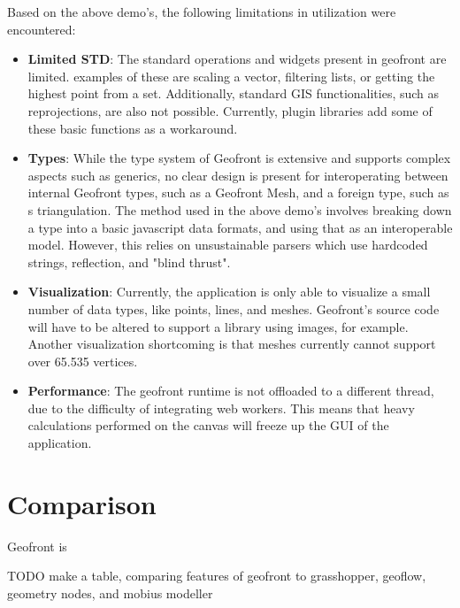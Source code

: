 Based on the above demo's, the following limitations in utilization were encountered: 
\begin{itemize}
  \item \textbf{Limited STD}: The standard operations and widgets present in geofront are limited. 
  examples of these are scaling a vector, filtering lists, or getting the highest point from a set.
  Additionally, standard \ac{GIS} functionalities, such as reprojections, are also not possible. 
  Currently, plugin libraries add some of these basic functions as a workaround.    

  \item \textbf{Types}: While the type system of Geofront is extensive and supports complex aspects such as generics, no clear design is present for interoperating between internal Geofront types, such as a Geofront Mesh, and a foreign type, such as s triangulation. 
  The method used in the above demo's involves breaking down a type into a basic javascript data formats, and using that as an interoperable model. 
  However, this relies on unsustainable parsers which use hardcoded strings, reflection, and "blind thrust".

  \item \textbf{Visualization}: Currently, the application is only able to visualize a small number of data types, like points, lines, and meshes. Geofront's source code will have to be altered to support a library using images, for example.
  Another visualization shortcoming is that meshes currently cannot support over 65.535 vertices. 
  
  \item \textbf{Performance}: The geofront runtime is not offloaded to a different thread, due to the difficulty of integrating web workers. 
  This means that heavy calculations performed on the canvas will freeze up the \ac{GUI} of the  application. 
 
\end{itemize} 


\section{Comparison}
\label{sec:testing:features}

Geofront is 

TODO make a table, comparing features of geofront to grasshopper, geoflow, geometry nodes, and mobius modeller









